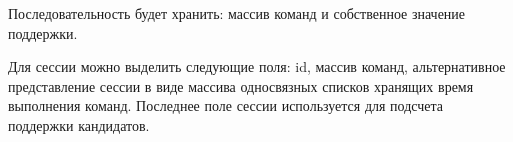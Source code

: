 Последовательность будет хранить:
массив команд и собственное значение поддержки.


Для сессии можно выделить следующие поля:
id, массив команд, альтернативное представление сессии в виде массива односвязных списков хранящих время выполнения команд.
Последнее поле сессии используется для подсчета поддержки кандидатов. 

%

